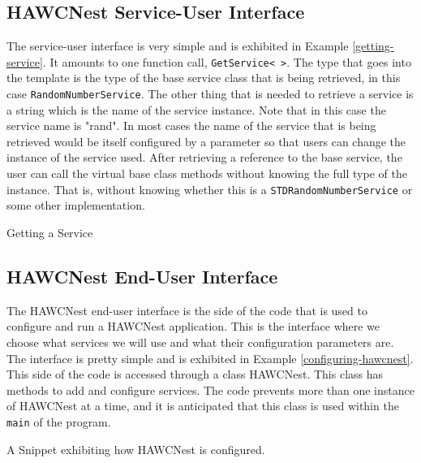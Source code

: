 \documentclass[12pt]{article}
\begin{document}
\subsection{HAWCNest Service-User Interface}
\label{suisection}

The service-user interface is very simple and is exhibited in 
Example \ref{getting-service}.  It amounts to one function call, 
{\tt GetService< >}.  The type that goes into the template is the 
type of the base service class that is being retrieved, in this case
{\tt RandomNumberService}.  The other thing that is needed to retrieve a service
is a string which is the name of the service instance.  Note that
in this case the service name is "rand".  In most cases the name of the service
that is being retrieved would be itself configured by a parameter so that
users can change the instance of the service used.  After retrieving a
reference to the base service, the user can call the virtual base class
methods without knowing the full type of the instance.  That is, without
knowing whether this is a {\tt STDRandomNumberService} or some other
implementation.

\begin{example}

\caption{Getting a Service}
\label{getting-service}
\end{example}



\subsection{HAWCNest End-User Interface}
\label{euisection}

The HAWCNest end-user interface is the side of the code that is used to 
configure and run a HAWCNest application.  This is the interface where
we choose what services we will use and what their configuration parameters
are.  The interface is pretty simple and is exhibited in 
Example \ref{configuring-hawcnest}.  This side of the code is accessed through
a class HAWCNest.  This class has methods to add and configure services.
The code prevents more than one instance of HAWCNest at a time, and it is
anticipated that this class is used within the {\tt main} of the program.

\begin{example}

\caption{A Snippet exhibiting how HAWCNest is configured.}
\label{configuring-hawcnest}
\end{example}
\end{document}
